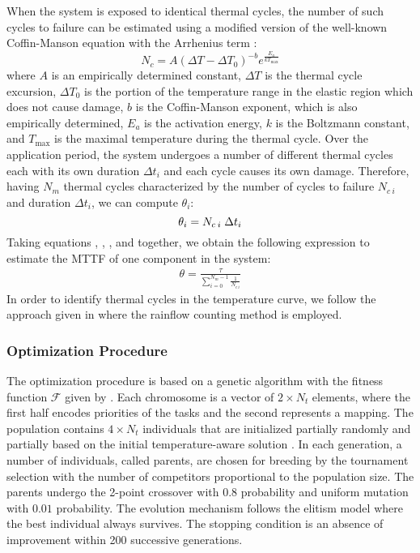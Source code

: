 When the system is exposed to identical thermal cycles, the number of such
cycles to failure can be estimated using a modified version of the well-known
Coffin-Manson equation with the Arrhenius term \cite{xiang2010, jedec2010}:
\[
  N_c = A (\Delta T - \Delta T_0)^{-b} e^{\frac{E_a}{k T_\text{max}}}
\]
where $A$ is an empirically determined constant, $\Delta T$ is the thermal cycle
excursion, $\Delta T_0$ is the portion of the temperature range in the elastic
region which does not cause damage, $b$ is the Coffin-Manson exponent, which is
also empirically determined, $E_{a}$ is the activation energy, $k$ is the
Boltzmann constant, and $T_\text{max}$ is the maximal temperature during the
thermal cycle. Over the application period, the system undergoes a number of
different thermal cycles each with its own duration $\Delta t_i$ and each cycle
causes its own damage. Therefore, having $N_m$ thermal cycles characterized by
the number of cycles to failure $N_{c\:i}$ and duration $\Delta t_i$, we can
compute $\theta_i$:
\begin{equation} \elab{mttf-cycle}
  \theta_i = N_{c \: i} \; \Delta t_i
\end{equation}
Taking equations , , , and
 together, we obtain the following expression to estimate the
MTTF of one component in the system:
\begin{align}
  \theta = \frac{\tau}{\sum_{i=0}^{N_m - 1} \frac{1}{N_{c \: i}}}
\end{align}
In order to identify thermal cycles in the temperature curve, we follow the
approach given in \cite{xiang2010} where the rainflow counting method is
employed.

\subsubsection{Optimization Procedure}

The optimization procedure is based on a genetic algorithm \cite{schmitz2004}
with the fitness function $\mathcal{F}$ given by . Each
chromosome is a vector of $2 \times N_t$ elements, where the first half encodes
priorities of the tasks and the second represents a mapping. The population
contains $4 \times N_t$ individuals that are initialized partially randomly and
partially based on the initial temperature-aware solution \cite{xie2006}. In
each generation, a number of individuals, called parents, are chosen for
breeding by the tournament selection with the number of competitors proportional
to the population size. The parents undergo the 2-point crossover with $0.8$
probability and uniform mutation with $0.01$ probability. The evolution
mechanism follows the elitism model where the best individual always survives.
The stopping condition is an absence of improvement within 200 successive
generations.

